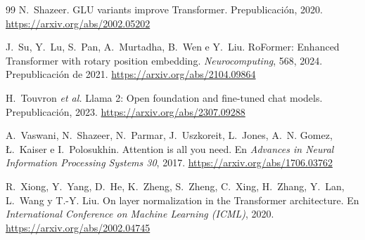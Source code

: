 \begin{thebibliography}{99}
N.~Shazeer.
\newblock GLU variants improve Transformer.
\newblock Prepublicación, 2020.
\newblock \url{https://arxiv.org/abs/2002.05202}

J.~Su, Y.~Lu, S.~Pan, A.~Murtadha, B.~Wen e Y.~Liu.
\newblock RoFormer: Enhanced Transformer with rotary position embedding.
\newblock \emph{Neurocomputing}, 568, 2024. Prepublicación de 2021.
\newblock \url{https://arxiv.org/abs/2104.09864}

H.~Touvron \emph{et al.}
\newblock Llama 2: Open foundation and fine-tuned chat models.
\newblock Prepublicación, 2023.
\newblock \url{https://arxiv.org/abs/2307.09288}

A.~Vaswani, N.~Shazeer, N.~Parmar, J.~Uszkoreit, L.~Jones, A.~N. Gomez, Ł.~Kaiser e I.~Polosukhin.
\newblock Attention is all you need.
\newblock En \emph{Advances in Neural Information Processing Systems 30}, 2017.
\newblock \url{https://arxiv.org/abs/1706.03762}

R.~Xiong, Y.~Yang, D.~He, K.~Zheng, S.~Zheng, C.~Xing, H.~Zhang, Y.~Lan, L.~Wang y T.-Y. Liu.
\newblock On layer normalization in the Transformer architecture.
\newblock En \emph{International Conference on Machine Learning (ICML)}, 2020.
\newblock \url{https://arxiv.org/abs/2002.04745}

\end{thebibliography}
